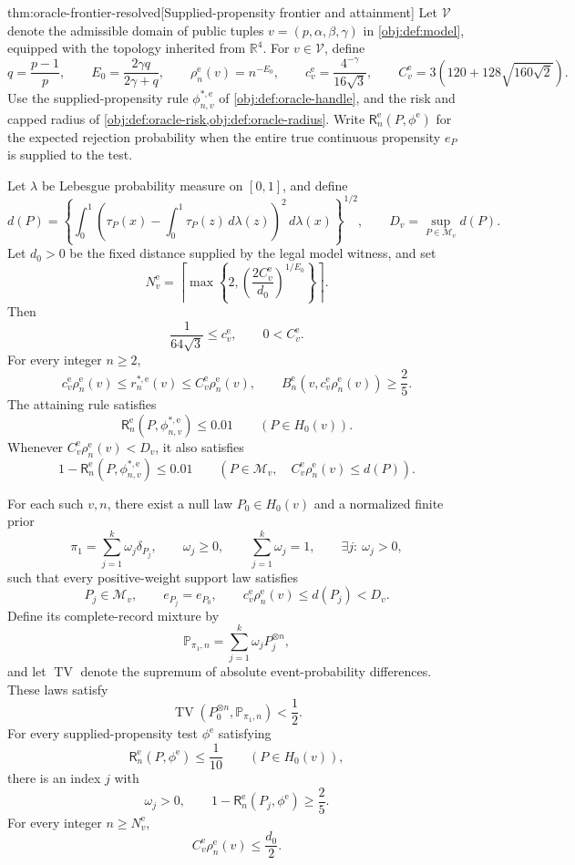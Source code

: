 \begin{theoremv}{thm:oracle-frontier-resolved}[Supplied-propensity frontier and attainment]
Let \(\mathcal V\) denote the admissible domain of public tuples \(v=(p,\alpha,\beta,\gamma)\) in \cref{obj:def:model}, equipped with the topology inherited from \(\mathbb R^4\). For \(v\in\mathcal V\), define
\[
q=\frac{p-1}{p},\qquad
E_0=\frac{2\gamma q}{2\gamma+q},\qquad
\rho_n^{\mathrm e}(v)=n^{-E_0},\qquad
c^{\mathrm e}_v=\frac{4^{-\gamma}}{16\sqrt3},\qquad
C^{\mathrm e}_v=3\left(120+128\sqrt{160\sqrt2}\right).
\]
Use the supplied-propensity rule \(\phi^{*,\mathrm e}_{n,v}\) of \cref{obj:def:oracle-handle}, and the risk and capped radius of \cref{obj:def:oracle-risk,obj:def:oracle-radius}. Write \(\mathsf R_n^{\mathrm e}(P,\phi^{\mathrm e})\) for the expected rejection probability when the entire true continuous propensity \(e_P\) is supplied to the test.

Let \(\lambda\) be Lebesgue probability measure on \([0,1]\), and define
\[
d(P)=
\left\{\int_0^1
\left(\tau_P(x)-\int_0^1\tau_P(z)\,d\lambda(z)\right)^2
\,d\lambda(x)\right\}^{1/2},
\qquad
D_v=\sup_{P\in\mathcal M_v}d(P).
\]
Let \(d_0>0\) be the fixed distance supplied by the legal model witness, and set
\[
N^{\mathrm e}_v=
\left\lceil
\max\left\{2,\left(\frac{2C^{\mathrm e}_v}{d_0}\right)^{1/E_0}\right\}
\right\rceil.
\]
Then
\[
\frac{1}{64\sqrt3}\le c^{\mathrm e}_v,
\qquad
0<C^{\mathrm e}_v.
\]
For every integer \(n\ge2\),
\[
c^{\mathrm e}_v\rho_n^{\mathrm e}(v)
\le r_n^{*,\mathrm e}(v)
\le C^{\mathrm e}_v\rho_n^{\mathrm e}(v),
\qquad
B_n^{\mathrm e}\!\left(v,c^{\mathrm e}_v\rho_n^{\mathrm e}(v)\right)
\ge\frac25.
\]
The attaining rule satisfies
\[
\mathsf R_n^{\mathrm e}\!\left(P,\phi^{*,\mathrm e}_{n,v}\right)
\le0.01
\qquad(P\in H_0(v)).
\]
Whenever \(C^{\mathrm e}_v\rho_n^{\mathrm e}(v)<D_v\), it also satisfies
\[
1-\mathsf R_n^{\mathrm e}\!\left(P,\phi^{*,\mathrm e}_{n,v}\right)
\le0.01
\qquad
\left(P\in\mathcal M_v,\quad
C^{\mathrm e}_v\rho_n^{\mathrm e}(v)\le d(P)\right).
\]

For each such \(v,n\), there exist a null law \(P_0\in H_0(v)\) and a normalized finite prior
\[
\pi_1=\sum_{j=1}^{k}\omega_j\delta_{P_j},
\qquad
\omega_j\ge0,\qquad
\sum_{j=1}^{k}\omega_j=1,\qquad
\exists j:\ \omega_j>0,
\]
such that every positive-weight support law satisfies
\[
P_j\in\mathcal M_v,\qquad
e_{P_j}=e_{P_0},\qquad
c^{\mathrm e}_v\rho_n^{\mathrm e}(v)\le d(P_j)<D_v.
\]
Define its complete-record mixture by
\[
\mathbb P_{\pi_1,n}=\sum_{j=1}^{k}\omega_jP_j^{\otimes n},
\]
and let \(\operatorname{TV}\) denote the supremum of absolute event-probability differences. These laws satisfy
\[
\operatorname{TV}\!\left(P_0^{\otimes n},\mathbb P_{\pi_1,n}\right)<\frac12.
\]
For every supplied-propensity test \(\phi^{\mathrm e}\) satisfying
\[
\mathsf R_n^{\mathrm e}(P,\phi^{\mathrm e})\le\frac1{10}
\qquad(P\in H_0(v)),
\]
there is an index \(j\) with
\[
\omega_j>0,\qquad
1-\mathsf R_n^{\mathrm e}(P_j,\phi^{\mathrm e})\ge\frac25.
\]
For every integer \(n\ge N^{\mathrm e}_v\),
\[
C^{\mathrm e}_v\rho_n^{\mathrm e}(v)\le\frac{d_0}{2}.
\]


\end{theoremv}
